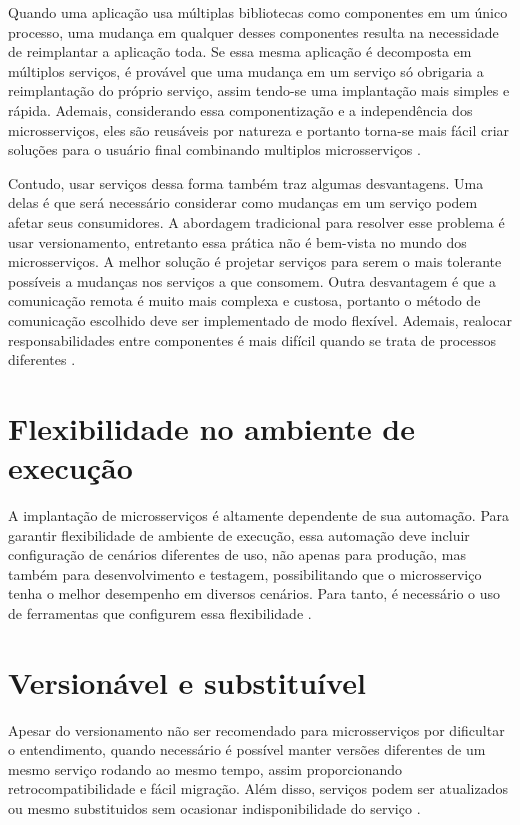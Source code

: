 Quando uma aplicação usa múltiplas bibliotecas como componentes em um único processo, uma mudança em qualquer desses componentes resulta na necessidade de reimplantar a aplicação toda. Se essa mesma aplicação é decomposta em múltiplos serviços, é provável que uma mudança em um serviço só obrigaria a reimplantação do próprio serviço, assim tendo-se uma implantação mais simples e rápida. Ademais, considerando essa componentização e a independência dos microsserviços, eles são reusáveis por natureza e portanto torna-se mais fácil criar soluções para o usuário final combinando multiplos microsserviços \cite{martin-fowler-microservices,Familiar2015}.

Contudo, usar serviços dessa forma também traz algumas desvantagens. Uma delas é que será necessário considerar como mudanças em um serviço podem afetar seus consumidores. A abordagem tradicional para resolver esse problema é usar versionamento, entretanto essa prática não é bem-vista no mundo dos microsserviços. A melhor solução é projetar serviços para serem o mais tolerante possíveis a mudanças nos serviços a que consomem. Outra desvantagem é que a comunicação remota é muito mais complexa e custosa, portanto o método de comunicação escolhido deve ser implementado de modo flexível. Ademais, realocar responsabilidades entre componentes é mais difícil quando se trata de processos diferentes \cite{martin-fowler-microservices}.

\section{Flexibilidade no ambiente de execução}

A implantação de microsserviços é altamente dependente de sua automação. Para garantir flexibilidade de ambiente de execução, essa automação deve incluir configuração de cenários diferentes de uso, não apenas para produção, mas também para desenvolvimento e testagem, possibilitando que o microsserviço tenha o melhor desempenho em diversos cenários. Para tanto, é necessário o uso de ferramentas que configurem essa flexibilidade \cite{Familiar2015}.

\section{Versionável e substituível}

Apesar do versionamento não ser recomendado para microsserviços por dificultar o entendimento, quando necessário é possível manter versões diferentes de um mesmo serviço rodando ao mesmo tempo, assim proporcionando retrocompatibilidade e fácil migração. Além disso, serviços podem ser atualizados ou mesmo substituidos sem ocasionar indisponibilidade do serviço \cite{Familiar2015}.

